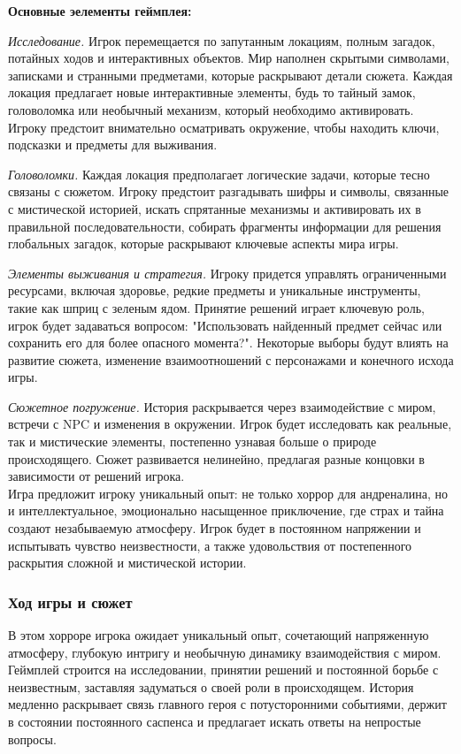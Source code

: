 \documentclass{article}
\begin{document}
	\textbf{Основные эелементы геймплея:}
	
	\textit{Исследование.} Игрок перемещается по запутанным локациям, полным загадок, потайных ходов и интерактивных объектов. Мир наполнен скрытыми символами, записками и странными предметами, которые раскрывают детали сюжета. Каждая локация предлагает новые интерактивные элементы, будь то тайный замок, головоломка или необычный механизм, который необходимо активировать. Игроку предстоит внимательно осматривать окружение, чтобы находить ключи, подсказки и предметы для выживания.
	
	\textit{Головоломки.} Каждая локация предполагает логические задачи, которые тесно связаны с сюжетом. Игроку предстоит разгадывать шифры и символы, связанные с мистической историей, искать спрятанные механизмы и активировать их в правильной последовательности, собирать фрагменты информации для решения глобальных загадок, которые раскрывают ключевые аспекты мира игры.
	
	\textit{Элементы выживания и стратегия.}  Игроку придется управлять ограниченными ресурсами, включая здоровье,  редкие предметы и уникальные инструменты, такие как шприц с зеленым ядом. Принятие решений играет ключевую роль, игрок будет задаваться вопросом: "Использовать найденный предмет сейчас или сохранить его для более опасного момента?". Некоторые выборы будут влиять на развитие сюжета, изменение взаимоотношений с персонажами и конечного исхода игры.
	
	\textit{Сюжетное погружение.} История раскрывается через взаимодействие с миром, встречи с NPC и изменения в окружении. Игрок будет исследовать как реальные, так и мистические элементы, постепенно узнавая больше о природе происходящего. Сюжет развивается нелинейно, предлагая разные концовки в зависимости от решений игрока. \\
	
	Игра предложит игроку уникальный опыт: не только хоррор для андреналина, но и интеллектуальное, эмоционально насыщенное приключение, где страх и тайна создают незабываемую атмосферу. Игрок будет в постоянном напряжении и испытывать чувство неизвестности, а также удовольствия от постепенного раскрытия сложной и мистической истории. \\
	
	\subsubsection{Ход игры и сюжет}
	
	В этом хорроре игрока ожидает уникальный опыт, сочетающий напряженную атмосферу, глубокую интригу и необычную динамику взаимодействия с миром. Геймплей строится на исследовании, принятии решений и постоянной борьбе с неизвестным, заставляя задуматься о своей роли в происходящем. История медленно раскрывает связь главного героя с потусторонними событиями, держит в состоянии постоянного саспенса и предлагает искать ответы на непростые вопросы.
	
\end{document}
